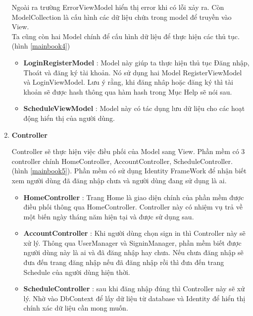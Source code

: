 \documentclass[a4paper]{article}
\begin{document}
\begin{enumerate}
\begin{itemize}
	\end{itemize}

			Ngoài ra trường ErrorViewModel hiển thị error khi có lỗi xảy ra. Còn ModelCollection là cấu hình các dữ liệu chứa trong model để truyền vào View. \\

			Ta cũng còn hai Model chính để cấu hình dữ liệu để thực hiện các thủ tục. (hình \ref{mainbook4})

			\begin{itemize}
				\item \textbf{LoginRegisterModel} : Model này giúp ta thực hiện thủ tục Đăng nhập, Thoát và đăng ký tài khoản. Nó sử dụng hai Model RegisterViewModel và LoginViewModel. Lưu ý rằng, khi đăng nhâp hoặc đăng ký thì tài khoản sẽ được hash thông qua hàm hash trong Mục Help sẽ nói sau.

				\item \textbf{ScheduleViewModel} : Model này có tác dụng lưu dữ liệu cho các hoạt động hiển thị của người dùng.



			\end{itemize}


	\item \textbf{Controller}

		Controller sẽ thực hiện việc điều phối của Model sang View. Phần mềm có 3 controller chính HomeController, AccountController, ScheduleController. (hình \ref{mainbook5}). Phần mềm có sử dụng Identity FrameWork để nhận biết xem người dùng đã đăng nhập chưa và người dùng đang sử dụng là ai.

	\begin{itemize}
		\item \textbf{HomeController} : Trang Home là giao diện chính của phần mềm được điều phối thông qua HomeController. Controller này có nhiệm vụ trả về một biến ngày tháng năm hiện tại và được sử dụng sau.

		\item \textbf{AccountController} : Khi người dùng chọn sign in thì Controller này sẽ xử lý. Thông qua UserManager và SigninManager, phần mềm biết được người dùng này là ai và đã đăng nhập hay chưa. Nếu chưa đăng nhập sẽ đưa đến trang đăng nhập nếu đã đăng nhập rồi thì đưa đến trang Schedule của người dùng hiện thời.

		\item \textbf{ScheduleController} : sau khi đăng nhập đúng thì Controller này sẽ xử lý. Nhờ vào DbContext để lấy dữ liệu từ database và Identity để hiển thị chính xác dữ liệu cần mong muốn.


\end{itemize}
\end{enumerate}
\end{document}
